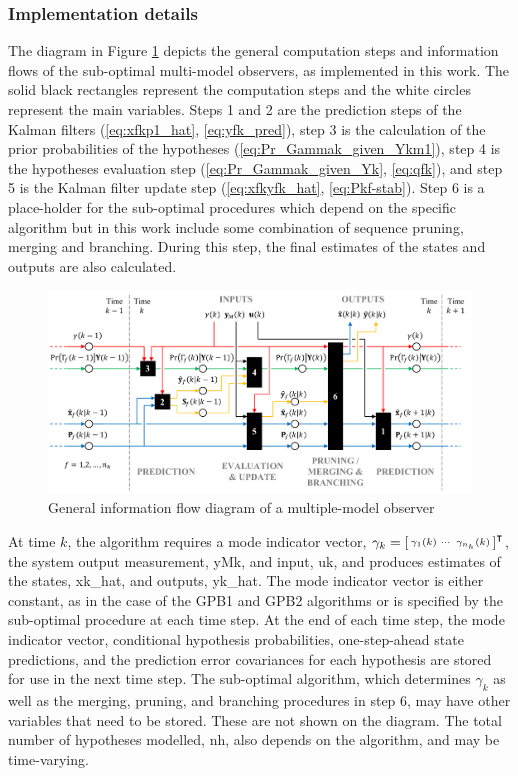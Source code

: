 \subsubsection{Implementation details} \label{sec:implementation}

The diagram in Figure \ref{fig:mkf-infoflow} depicts the general computation steps and information flows of the sub-optimal multi-model observers, as implemented in this work. The solid black rectangles represent the computation steps and the white circles represent the main variables. Steps 1 and 2 are the prediction steps of the Kalman filters (\ref{eq:xfkp1_hat}, \ref{eq:yfk_pred}), step 3 is the calculation of the prior probabilities of the hypotheses (\ref{eq:Pr_Gammak_given_Ykm1}), step 4 is the hypotheses evaluation step (\ref{eq:Pr_Gammak_given_Yk}, \ref{eq:qfk}), and step 5 is the Kalman filter update step (\ref{eq:xfkyfk_hat}, \ref{eq:Pkf-stab}). Step 6 is a place-holder for the sub-optimal procedures which depend on the specific algorithm but in this work include some combination of sequence pruning, merging and branching. During this step, the final estimates of the states and outputs are also calculated.

\begin{figure}[ht]
	\centering
	\includegraphics[width=15.5cm]{images/mkf_infoflow.pdf}
	\caption{General information flow diagram of a multiple-model observer}
	\label{fig:mkf-infoflow}
\end{figure}

At time $k$, the algorithm requires a mode indicator vector, $\gamma_k=\begin{bsmallmatrix} \gamma_1(k) & \cdots & \gamma_{n_h}(k) \end{bsmallmatrix}^\intercal$, the system output measurement, \gls{yMk}, and input, \gls{uk}, and produces estimates of the states, \gls{xk_hat}, and outputs, \gls{yk_hat}. The mode indicator vector is either constant, as in the case of the \gls{GPB1} and \gls{GPB2} algorithms or is specified by the sub-optimal procedure at each time step. At the end of each time step, the mode indicator vector, conditional hypothesis probabilities, one-step-ahead state predictions, and the prediction error covariances for each hypothesis are stored for use in the next time step. The sub-optimal algorithm, which determines $\gamma_k$ as well as the merging, pruning, and branching procedures in step 6, may have other variables that need to be stored. These are not shown on the diagram. The total number of hypotheses modelled, \gls{nh}, also depends on the algorithm, and may be time-varying.

